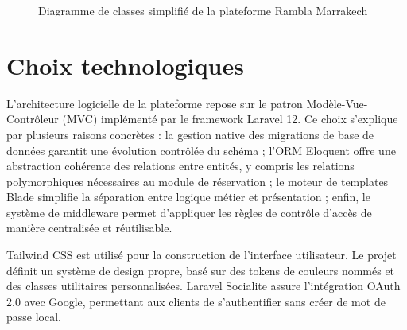\documentclass[12pt,a4paper]{report}
\begin{document}
\begin{figure}[H]
    \caption{Diagramme de classes simplifié de la plateforme Rambla Marrakech}
    \label{fig:classes}
\end{figure}

\section{Choix technologiques}

L'architecture logicielle de la plateforme repose sur le patron
Modèle-Vue-Contrôleur (MVC) implémenté par le framework Laravel 12. Ce
choix s'explique par plusieurs raisons concrètes : la gestion native des
migrations de base de données garantit une évolution contrôlée du schéma ;
l'ORM Eloquent offre une abstraction cohérente des relations entre
entités, y compris les relations polymorphiques nécessaires au module de
réservation ; le moteur de templates Blade simplifie la séparation entre
logique métier et présentation ; enfin, le système de middleware permet
d'appliquer les règles de contrôle d'accès de manière centralisée et
réutilisable.

Tailwind CSS est utilisé pour la construction de l'interface utilisateur.
Le projet définit un système de design propre, basé sur des tokens de
couleurs nommés et des classes utilitaires personnalisées. Laravel
Socialite assure l'intégration OAuth 2.0 avec Google, permettant aux
clients de s'authentifier sans créer de mot de passe local.
\end{document}
